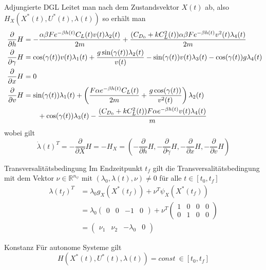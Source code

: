 \documentclass[aspectratio=169]{beamer}
\newcommand{\R}{\mathbb{R}}
\begin{document}
\begin{frame}
  \begin{block}{Adjungierte DGL}  
  \scriptsize
Leitet man nach dem Zustandsvektor $X(t)$ ab, also $H_{X}(X^{\ast}(t),U^{\ast}(t),\lambda(t))$ so erhält man 
        \[\begin{split}
            \dfrac{\partial}{\partial h} H &= - \dfrac{\alpha \beta F e^{-\beta h(t)} C_L(t) v(t) \lambda_2(t)}{2m} + \dfrac{(C_{D_0}+k C_L^2(t)) \alpha \beta F e^{-\beta h(t)} v^2(t) \lambda_4(t)}{2m} \\\
            \dfrac{\partial}{\partial \gamma} H &= \cos(\gamma(t)) v(t) \lambda_1(t) + \dfrac{g \sin(\gamma(t)) \lambda_2(t)}{v(t)} - \sin(\gamma(t)) v(t) \lambda_3(t) - \cos(\gamma(t)) g \lambda_4(t) \\\
            \dfrac{\partial}{\partial x} H &= 0 \\\
            \dfrac{\partial}{\partial v} H &= \sin(\gamma(t)) \lambda_1(t) + \left( \dfrac{F \alpha e^{-\beta h(t)} C_L(t)}{2m} + \dfrac{g \cos(\gamma(t))}{v^2(t)} \right) \lambda_2(t) \\\
            &\hspace{7mm} + \cos(\gamma(t)) \lambda_3(t) - \dfrac{(C_{D_0} + k C_L^2(t)) F \alpha e^{-\beta h(t)} v(t) \lambda_4(t)}{m}
        \end{split}\]
        wobei gilt 
        \[\dot{\lambda}(t)^T = - \dfrac{\partial}{\partial X} H = -H_{X} = \left( -\dfrac{\partial}{\partial h} H, -\dfrac{\partial}{\partial \gamma} H, -\dfrac{\partial}{\partial x} H, -\dfrac{\partial}{\partial v} H \right)\]
  \end{block}
\end{frame}


\begin{frame}
\begin{block}{Transversalitätsbedingung} 
  \scriptsize
Im Endzeitpunkt $t_f$ gilt die Transversalitätsbedingung mit dem Vektor $\nu \in \R^{n_{\psi}}$ mit $(\lambda_0,\lambda(t),\nu) \neq 0$ für alle $t \in [t_0,t_f]$
        \[\begin{split}
            \lambda(t_f)^T &= \lambda_0 g_X(X^{\ast}(t_f)) + \nu^T \psi_X(X^{\ast}(t_f)) \\\
            &= \lambda_0 
            \begin{pmatrix}
            0 & 0 & -1 & 0
            \end{pmatrix}  
            + \nu^T 
            \begin{pmatrix}
            1 & 0 & 0 & 0 \\
            0 & 1 & 0 & 0 
            \end{pmatrix}  \\\
            &= \begin{pmatrix}
            \nu_1 & \nu_2 & -\lambda_0 & 0 
            \end{pmatrix}
        \end{split}\]
  \end{block}
  \begin{block}{Konstanz} 
  \scriptsize
 Für autonome Systeme gilt \[H(X^{\ast}(t),U^{\ast}(t), \lambda(t)) = const \ \in [t_0,t_f]\]
   \end{block}
\end{frame}
\end{document}
